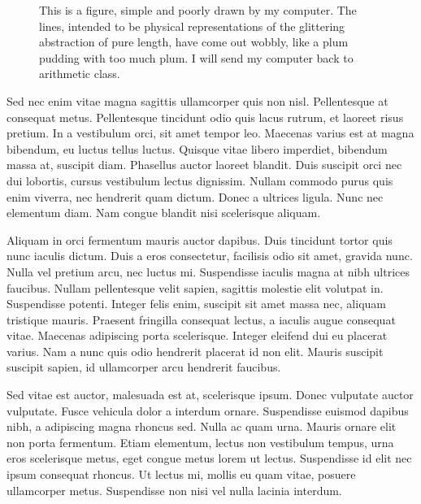 \documentclass[9pt]{memoir}
\begin{document}
\begin{figure}
\begin{adjustwidth*}{-1in}{0pt}
\centering
{}
\end{adjustwidth*}
\caption{This is a figure, simple and poorly drawn by my computer. The lines, intended to be physical representations of the glittering abstraction of pure length, have come out wobbly, like a plum pudding with too much plum. I will send my computer back to arithmetic class.}
\label{fig:myfig}
\end{figure}

Sed nec enim vitae magna sagittis ullamcorper quis non nisl. Pellentesque at consequat metus. Pellentesque tincidunt odio quis lacus rutrum, et laoreet risus pretium. In a vestibulum orci, sit amet tempor leo. Maecenas varius est at magna bibendum, eu luctus tellus luctus. Quisque vitae libero imperdiet, bibendum massa at, suscipit diam. Phasellus auctor laoreet blandit. Duis suscipit orci nec dui lobortis, cursus vestibulum lectus dignissim. Nullam commodo purus quis enim viverra, nec hendrerit quam dictum. Donec a ultrices ligula. Nunc nec elementum diam. Nam congue blandit nisi scelerisque aliquam.

Aliquam in orci fermentum mauris auctor dapibus. Duis tincidunt tortor quis nunc iaculis dictum. Duis a eros consectetur, facilisis odio sit amet, gravida nunc. Nulla vel pretium arcu, nec luctus mi. Suspendisse iaculis magna at nibh ultrices faucibus. Nullam pellentesque velit sapien, sagittis molestie elit volutpat in. Suspendisse potenti. Integer felis enim, suscipit sit amet massa nec, aliquam tristique mauris. Praesent fringilla consequat lectus, a iaculis augue consequat vitae. Maecenas adipiscing porta scelerisque. Integer eleifend dui eu placerat varius. Nam a nunc quis odio hendrerit placerat id non elit. Mauris suscipit suscipit sapien, id ullamcorper arcu hendrerit faucibus.

Sed vitae est auctor, malesuada est at, scelerisque ipsum. Donec vulputate auctor vulputate. Fusce vehicula dolor a interdum ornare. Suspendisse euismod dapibus nibh, a adipiscing magna rhoncus sed. Nulla ac quam urna. Mauris ornare elit non porta fermentum. Etiam elementum, lectus non vestibulum tempus, urna eros scelerisque metus, eget congue metus lorem ut lectus. Suspendisse id elit nec ipsum consequat rhoncus. Ut lectus mi, mollis eu quam vitae, posuere ullamcorper metus. Suspendisse non nisi vel nulla lacinia interdum.
\end{document}

